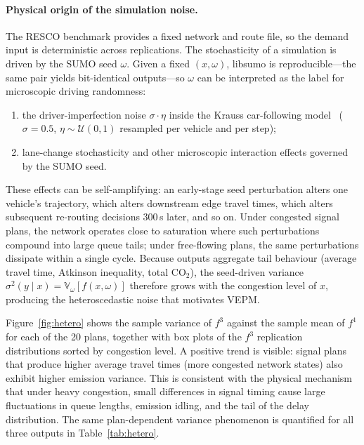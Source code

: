\documentclass[12pt]{article}
\theoremstyle{plain}
\theoremstyle{definition}
\theoremstyle{remark}
\begin{document}
\paragraph{Physical origin of the simulation noise.}
The RESCO benchmark provides a fixed network and route file, so the
demand input is deterministic across replications.  The stochasticity
of a simulation is driven by the SUMO seed $\omega$.  Given a fixed
$(x,\omega)$, libsumo is reproducible---the same pair yields
bit-identical outputs---so $\omega$ can be interpreted as the label for
microscopic driving randomness:
\begin{enumerate}[label=(\roman*),leftmargin=2.5em]
  \item the driver-imperfection noise $\sigma\cdot\eta$ inside the
  Krauss car-following model~\citep{Krauss1998} ($\sigma=0.5$,
  $\eta\sim\mathcal{U}(0,1)$ resampled per vehicle and per step);
  \item lane-change stochasticity and other microscopic interaction
  effects governed by the SUMO seed.
\end{enumerate}

These effects can be self-amplifying: an early-stage seed perturbation
alters one vehicle's trajectory, which alters downstream edge
travel times, which alters subsequent re-routing decisions $300$\,s
later, and so on.  Under congested signal plans, the network operates
close to saturation where such perturbations compound into large
queue tails; under free-flowing plans, the same perturbations dissipate
within a single cycle.  Because outputs aggregate tail behaviour
(average travel time, Atkinson inequality, total CO$_{2}$), the
seed-driven variance
$\sigma^{2}(y\mid x)=\mathbb{V}_{\omega}[f(x,\omega)]$ therefore
grows with the congestion level of $x$, producing the heteroscedastic
noise that motivates VEPM.

Figure~\ref{fig:hetero} shows the sample variance of $f^{3}$ against
the sample mean of $f^{1}$ for each of the 20 plans, together with box
plots of the $f^{3}$ replication distributions sorted by congestion
level.  A positive trend is visible: signal plans that produce higher
average travel times (more congested network states) also exhibit
higher emission variance.  This is consistent with the physical
mechanism that under heavy congestion, small differences in signal
timing cause large fluctuations in queue lengths, emission idling, and
the tail of the delay distribution.  The same plan-dependent variance
phenomenon is quantified for all three outputs in
Table~\ref{tab:hetero}.
\end{document}
